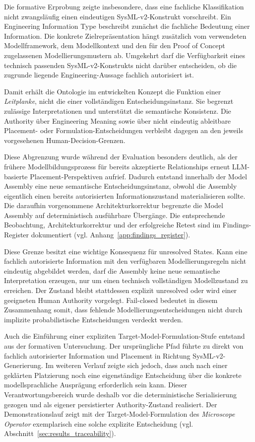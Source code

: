 Die formative Erprobung zeigte insbesondere, dass eine fachliche
Klassifikation nicht zwangsläufig einen eindeutigen SysML-v2-Konstrukt
vorschreibt. Ein Engineering Information Type beschreibt zunächst die
fachliche Bedeutung einer Information. Die konkrete Zielrepräsentation hängt
zusätzlich vom verwendeten Modellframework, dem Modellkontext und den für den
Proof of Concept zugelassenen Modellierungsmustern ab. Umgekehrt darf die
Verfügbarkeit eines technisch passenden SysML-v2-Konstrukts nicht darüber
entscheiden, ob die zugrunde liegende Engineering-Aussage fachlich autorisiert
ist.

Damit erhält die Ontologie im entwickelten Konzept die Funktion einer
\emph{Leitplanke}, nicht die einer vollständigen Entscheidungsinstanz. Sie
begrenzt zulässige Interpretationen und unterstützt die semantische
Konsistenz. Die Authority über Engineering Meaning sowie über nicht eindeutig
ableitbare Placement- oder Formulation-Entscheidungen verbleibt dagegen an
den jeweils vorgesehenen Human-Decision-Grenzen.

Diese Abgrenzung wurde während der Evaluation besonders deutlich, als der
frühere Modellbildungsprozess für bereits akzeptierte Relationships erneut
LLM-basierte Placement-Perspektiven aufrief. Dadurch entstand innerhalb der
Model Assembly eine neue semantische Entscheidungsinstanz, obwohl die
Assembly eigentlich einen bereits autorisierten Informationszustand
materialisieren sollte. Die daraufhin vorgenommene Architekturkorrektur
begrenzte die Model Assembly auf deterministisch ausführbare Übergänge. Die
entsprechende Beobachtung, Architekturkorrektur und der erfolgreiche Retest
sind im Findings-Register dokumentiert
(vgl. Anhang~\ref{app:findings_register}).

Diese Grenze besitzt eine wichtige Konsequenz für unresolved States. Kann eine
fachlich autorisierte Information mit den verfügbaren Modellierungsregeln
nicht eindeutig abgebildet werden, darf die Assembly keine neue semantische
Interpretation erzeugen, nur um einen technisch vollständigen Modellzustand
zu erreichen. Der Zustand bleibt stattdessen explizit unresolved oder wird
einer geeigneten Human Authority vorgelegt. Fail-closed bedeutet in diesem
Zusammenhang somit, dass fehlende Modellierungsentscheidungen nicht durch
implizite probabilistische Entscheidungen verdeckt werden.

Auch die Einführung einer expliziten Target-Model-Formulation-Stufe entstand
aus der formativen Untersuchung. Der ursprüngliche Pfad führte zu direkt von
fachlich autorisierter Information und Placement in Richtung
SysML-v2-Generierung. Im weiteren Verlauf zeigte sich jedoch, dass auch nach
einer geklärten Platzierung noch eine eigenständige Entscheidung über die
konkrete modellsprachliche Ausprägung erforderlich sein kann. Dieser
Verantwortungsbereich wurde deshalb vor die deterministische Serialisierung
gezogen und als eigener persistierter Authority-Zustand realisiert. Der
Demonstrationslauf zeigt mit der Target-Model-Formulation des
\emph{Microscope Operator} exemplarisch eine solche explizite Entscheidung
(vgl. Abschnitt~\ref{sec:results_traceability}).

